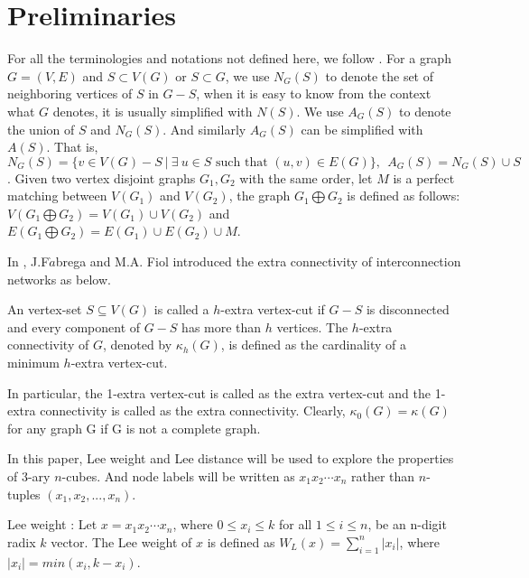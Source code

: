 \documentclass[preprint,number,12pt]{elsarticle}
\begin{document}
\section{Preliminaries} \label{S2:Preliminaties}
For all the terminologies and notations not defined here, we
follow \cite{1097029}. For a graph $G = (V, E)$ and $S\subset V(G)$
or $S\subset G$, we use $N_G(S)$  to denote the set of
neighboring vertices  of $S$ in $G- S$, when it is easy to know
from the context what $G$ denotes, it is usually simplified with
$N(S)$. We use $A_G(S)$ to denote the union of $S$ and $N_G(S)$.
And similarly  $A_G(S)$ can be simplified with $A(S)$.
That is, $N_G(S)=\{v\in V(G)-S \ |\  \exists\  u\in S \mbox{ such that } (u, v)\in E(G) \},  \ \
 A_G(S)=N_G(S)\cup S$. Given two vertex disjoint graphs $G_1, G_2$ with the same order,
let $M$ is a perfect matching between $V(G_1)$ and $V(G_2)$,
the graph $G_1\bigoplus G_2$ is defined as follows: $V(G_1\bigoplus G_2)=V(G_1) \cup V(G_2)$ and $E(G_1\bigoplus G_2)=E(G_1) \cup E(G_2) \cup M$.

In \cite{F`abrega1994-p163-170}, J.F$\grave{a}$brega and M.A. Fiol introduced the extra connectivity of interconnection networks as below.

\begin{defn} \cite{F`abrega1994-p163-170}
An vertex-set $S \subseteq V(G)$ is called a $h$-extra vertex-cut if $G-S$ is disconnected and every component of $G-S$ has more than $h$ vertices. The $h$-extra connectivity of $G$, denoted by $\kappa_h(G)$, is defined as the cardinality of a minimum $h$-extra vertex-cut.
\end{defn}

In particular, the 1-extra vertex-cut is called as the extra vertex-cut and the 1-extra connectivity is called as the extra connectivity. Clearly, $\kappa_0(G) =  \kappa(G)$ for any graph G if G is not a complete graph.

In this paper, Lee weight and Lee distance will be used to explore the properties of $3$-ary $n$-cubes. And node labels will be written as $x_{1}x_{2} \cdots x_{n}$ rather than $n$-tuples $(x_1, x_2, ..., x_n)$.

\begin{defn}Lee weight \cite{Bose1995-p1021-1030}:
Let $x = x_{1}x_{2} \cdots x_{n}$, where $0 \leq x_{i} \leq k$ for all $1 \leq i \leq n$, be an n-digit radix $k$ vector. The Lee weight of $x$ is defined as $W_{L}(x) =  \sum_{i = 1}^{n} |x_{i}|$, where $|x_{i}| = min(x_{i}, k-x_{i})$.
\end{defn}
\end{document}
